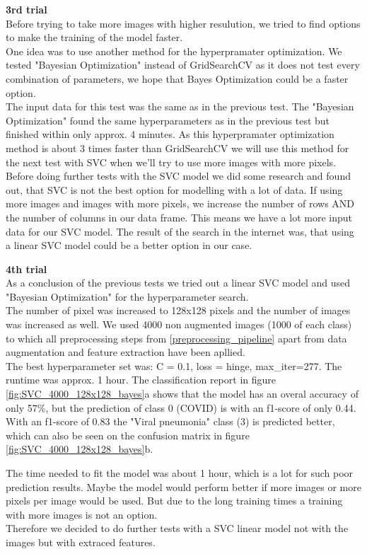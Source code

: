 \documentclass{article}
\begin{document}
\textbf{3rd trial }\\
Before trying to take more images with higher resulution, we tried to find options to make the training of the model faster.\\
One idea was to use another method for the hyperpramater optimization. We tested "Bayesian Optimization" instead of GridSearchCV as it does not test every 
combination of parameters, we hope that Bayes Optimization could be a faster option.\\
The input data for this test was the same as in the previous test. The "Bayesian Optimization" found the same hyperparameters as in the previous test but finished 
within only approx. 4 minutes. As this hyperpramater optimization method is about 3 times faster than GridSearchCV we will use this method for the next test with SVC 
when we'll try to use more images with more pixels. \\
Before doing further tests with the SVC model we did some research and found out, that SVC is not the best option for modelling with a lot of data. 
If using more images and images with more pixels, we increase the number of rows AND the number of columns in our data frame. This means we have a lot more input
data for our SVC model. The result of the search in the internet was, that using a linear SVC model could be a better option in our case. 

\textbf{4th trial }\\
As a conclusion of the previous tests we tried out a linear SVC model and used "Bayesian Optimization" for the hyperparameter search.\\
The number of pixel was increased to 128x128 pixels and the number of images was increased as well. We used 4000 non augmented images (1000 of each class) to  which all
preprocessing steps from \ref{preprocessing_pipeline} apart from data augmentation and feature extraction have been apllied. \\

The best hyperparameter set was: C = 0.1,  loss = hinge, max\_iter=277. The runtime was approx. 1 hour. The classification report in figure 
\ref{fig:SVC_4000_128x128_bayes}a shows that the model has an overal accuracy of only  57\%, but the prediction of class 0 (COVID) is  with an f1-score of 
only 0.44. With an f1-score of 0.83 the "Viral pneumonia" class (3) is predicted better, which can also be seen on the confusion matrix in figure 
\ref{fig:SVC_4000_128x128_bayes}b.

The time needed to fit the model was about 1 hour, which is a lot for such poor prediction results. Maybe the model would perform better if more images or more pixels 
per image would be used. But due to the long training times a training with more images is not an option.\\
Therefore we decided to do further tests  with a SVC linear model not with the images but with extraced features.\\
\end{document}
